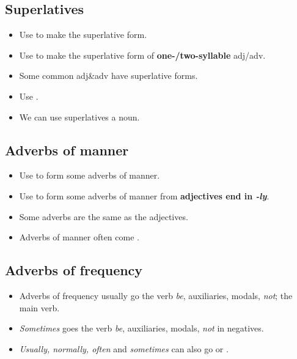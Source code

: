 \subsection{Superlatives}
\begin{itemize}
    \item Use  to make the superlative form.
    \item Use  to make the superlative form of \textbf{one-/two-syllable} adj/adv.
    \item Some common adj\&adv have  superlative forms.
    \item Use .
    \item We can use superlatives  a noun.
\end{itemize}

\subsection{Adverbs of manner}
\begin{itemize}
    \item Use  to form some adverbs of manner.
    \item Use  to form some adverbs of manner from \textbf{adjectives end in \textit{-ly}}.
    \item Some adverbs are the same as the adjectives.
    \item Adverbs of manner often come .
\end{itemize}

\subsection{Adverbs of frequency}
\begin{itemize}
    \item Adverbs of frequency usually go
     the verb \textit{be}, auxiliaries, modals, \textit{not};  the main verb.
    \item[\ast] \textit{Sometimes} goes  the verb \textit{be}, auxiliaries, modals, \textit{not} in negatives.
    \item[\ast] \textit{Usually, normally, often} and \textit{sometimes}
    can also go  or .
\end{itemize}